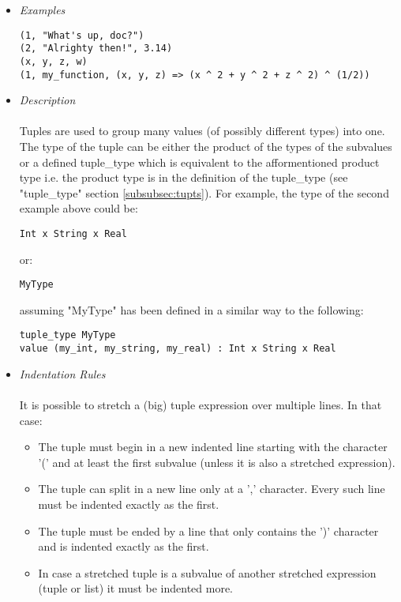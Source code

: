 \documentclass{article}
\begin{document}
\begin{itemize}

\item \textit{Examples}
\begin{verbatim}
(1, "What's up, doc?")
(2, "Alrighty then!", 3.14)
(x, y, z, w)
(1, my_function, (x, y, z) => (x ^ 2 + y ^ 2 + z ^ 2) ^ (1/2))
\end{verbatim}

\item \textit{Description} \\\\
Tuples are used to group many values (of possibly different types) into one.
The type of the tuple can be either the product of the types of the subvalues or a
defined tuple\_type which is equivalent to the afformentioned product type i.e.
the product type is in the definition of the tuple\_type (see "tuple\_type"
section \ref{subsubsec:tupts}). For example, the type of the second example above 
could be:
\begin{verbatim}
Int x String x Real
\end{verbatim}
or:
\begin{verbatim}
MyType
\end{verbatim}
assuming "MyType" has been defined in a similar way to the following:
\begin{verbatim}
tuple_type MyType
value (my_int, my_string, my_real) : Int x String x Real
\end{verbatim}

\item \textit{Indentation Rules} \\\\
It is possible to stretch a (big) tuple expression over multiple lines.
In that case:
\begin{itemize}
\item
The tuple must begin in a new indented line starting with the character '(' and 
at least the first subvalue (unless it is also a stretched expression).

\item
The tuple can split in a new line only at a ',' character. Every such line must
be indented exactly as the first.

\item
The tuple must be ended by a line that only contains the ')' character and is 
indented exactly as the first.

\item
In case a stretched tuple is a subvalue of another stretched expression (tuple
or list) it must be indented more.


\end{itemize}
\end{itemize}
\end{document}
